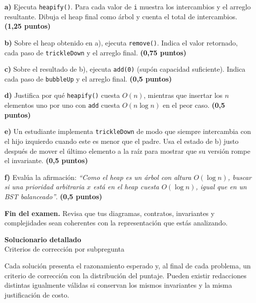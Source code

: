 \documentclass[11pt,a4paper]{article}
\newcommand{\pts}[1]{\textbf{(#1)}}
\begin{document}
\textbf{a)} Ejecuta \texttt{heapify()}. Para cada valor de \texttt{i} muestra los intercambios y el arreglo resultante. Dibuja el heap final como árbol y cuenta el total de intercambios. \pts{1,25 puntos}

\textbf{b)} Sobre el heap obtenido en a), ejecuta \texttt{remove()}. Indica el valor retornado, cada paso de \texttt{trickleDown} y el arreglo final. \pts{0,75 puntos}

\textbf{c)} Sobre el resultado de b), ejecuta \texttt{add(0)} (supón capacidad suficiente). Indica cada paso de \texttt{bubbleUp} y el arreglo final. \pts{0,5 puntos}

\textbf{d)} Justifica por qué \texttt{heapify()} cuesta $O(n)$, mientras que insertar los $n$ elementos uno por uno con \texttt{add} cuesta $O(n \log n)$ en el peor caso. \pts{0,5 puntos}

\textbf{e)} Un estudiante implementa \texttt{trickleDown} de modo que siempre intercambia con el hijo izquierdo cuando este es menor que el padre. Usa el estado de b) justo después de mover el último elemento a la raíz para mostrar que su versión rompe el invariante. \pts{0,5 puntos}

\textbf{f)} Evalúa la afirmación: \emph{``Como el heap es un árbol con altura $O(\log n)$, buscar si una prioridad arbitraria $x$ está en el heap cuesta $O(\log n)$, igual que en un BST balanceado''}. \pts{0,5 puntos}

\vfill
\begin{center}
\textbf{Fin del examen.} Revisa que tus diagramas, contratos, invariantes y complejidades sean coherentes con la representación que estás analizando.
\end{center}

\newpage
\begin{center}
{\LARGE\bfseries Solucionario detallado}\\[4pt]
{\large Criterios de corrección por subpregunta}
\end{center}

\begin{tcolorbox}[enhanced,sharp corners,colback=white,colframe=black!70,boxrule=0.5pt]
Cada solución presenta el razonamiento esperado y, al final de cada problema, un criterio de corrección con la distribución del puntaje. Pueden existir redacciones distintas igualmente válidas si conservan los mismos invariantes y la misma justificación de costo.
\end{tcolorbox}
\end{document}
